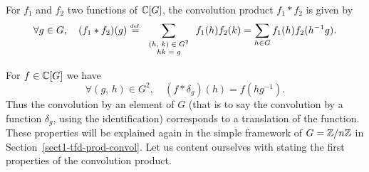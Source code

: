 \begin{defn}
 \label{notation-23} For $ f_1$ and $ f_2 $ two functions of $\mathbb{C}[G]$, the convolution product $ f_1 * f_2 $ is given by
\begin{equation}
\label{eq-formula-prod-convol-grpe-abelien}
\forall g \in G, \quad (f_1 * f_2)(g) \stackrel{\mbox{\upshape\tiny def.}}{=} \sum_{\scriptsize \begin{array}{c} (h, \, k) \in G^2 \\hk = g \end{array}}{f_1(h) f_2 (k)} = \sum_{h \in G}{f_1(h) f_2 (h^{-1} g)}.
\end{equation}

\end{defn}


\begin{rem}
For $ f \in \mathbb{C}[G]$ we have
\begin{equation*}
\forall (g, \, h) \in G^2, \quad (f * \delta_g)(h) = f (h g^{-1}).
\end{equation*}
Thus the convolution by an element of $G$ (that is to say the convolution by a function $\delta_g$, using the identification) corresponds to a translation of the function. These properties will be explained again in the simple framework of $ G = \mathbb{Z}/n\mathbb{Z}$ in Section~\ref{sect1-tfd-prod-convol}. Let us content ourselves with stating the first properties of the convolution product.
\end{rem}


